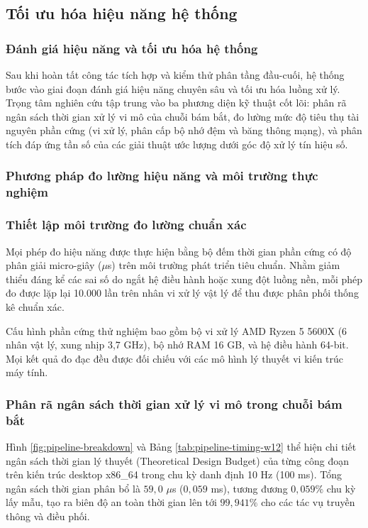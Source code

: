 \subsection{Tối ưu hóa hiệu năng hệ thống}

\subsubsection{Đánh giá hiệu năng và tối ưu hóa hệ thống}

\hspace{0.5cm} Sau khi hoàn tất công tác tích hợp và kiểm thử phân tầng đầu-cuối, hệ thống bước vào giai đoạn đánh giá hiệu năng chuyên sâu và tối ưu hóa luồng xử lý. Trọng tâm nghiên cứu tập trung vào ba phương diện kỹ thuật cốt lõi: phân rã ngân sách thời gian xử lý vi mô của chuỗi bám bắt, đo lường mức độ tiêu thụ tài nguyên phần cứng (vi xử lý, phân cấp bộ nhớ đệm và băng thông mạng), và phân tích đáp ứng tần số của các giải thuật ước lượng dưới góc độ xử lý tín hiệu số.

\subsubsection{Phương pháp đo lường hiệu năng và môi trường thực nghiệm}

\subsubsection{Thiết lập môi trường đo lường chuẩn xác}

\hspace{0.5cm} Mọi phép đo hiệu năng được thực hiện bằng bộ đếm thời gian phần cứng có độ phân giải micro-giây ($\mu$s) trên môi trường phát triển tiêu chuẩn. Nhằm giảm thiểu đáng kể các sai số do ngắt hệ điều hành hoặc xung đột luồng nền, mỗi phép đo được lặp lại 10.000 lần trên nhân vi xử lý vật lý để thu được phân phối thống kê chuẩn xác.

Cấu hình phần cứng thử nghiệm bao gồm bộ vi xử lý AMD Ryzen 5 5600X (6 nhân vật lý, xung nhịp 3,7 GHz), bộ nhớ RAM 16 GB, và hệ điều hành 64-bit. Mọi kết quả đo đạc đều được đối chiếu với các mô hình lý thuyết vi kiến trúc máy tính.

\subsubsection{Phân rã ngân sách thời gian xử lý vi mô trong chuỗi bám bắt}

\hspace{0.5cm} Hình \ref{fig:pipeline-breakdown} và Bảng \ref{tab:pipeline-timing-w12} thể hiện chi tiết ngân sách thời gian lý thuyết (Theoretical Design Budget) của từng công đoạn trên kiến trúc desktop x86\_64 trong chu kỳ danh định 10 Hz (100 ms). Tổng ngân sách thời gian phân bổ là $59{,}0$ $\mu$s ($0{,}059$ ms), tương đương $0{,}059\%$ chu kỳ lấy mẫu, tạo ra biên độ an toàn thời gian lên tới $99{,}941\%$ cho các tác vụ truyền thông và điều phối.

